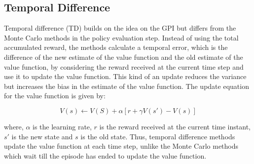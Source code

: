         \subsection{Temporal Difference}
        Temporal difference (TD) builds on the idea on the GPI but differs from the Monte Carlo
        methods in the policy evaluation step. Instead of using the total accumulated reward, the
        methods calculate a temporal error, which is the difference of the new estimate of the value
        function and the old estimate of the value function, by considering the reward received at the
        current time step and use it to update the value function. This kind of an update reduces the
        variance but increases the bias in the estimate of the value function. The update equation
        for the value function is given by:
        
        \begin{equation}\label{eq:24}
            V(s) \gets V(S) + \alpha[r+\gamma V(s') - V(s)]
        \end{equation}
        
        where, $\alpha$ is the learning rate, $r$ is the reward received at the current time instant, $s'$ is the new state and $s$ is the old state. Thus, temporal difference methods update the value function at each time step, unlike the Monte Carlo methods which wait till the episode has ended to update the value function.
        
